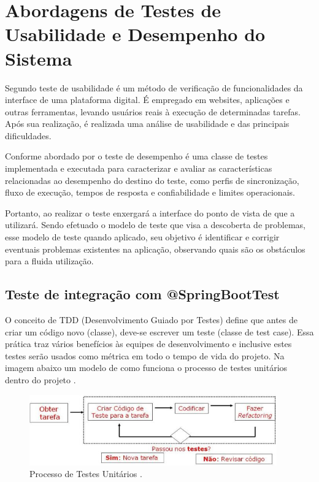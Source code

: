     
\section{Abordagens de Testes de Usabilidade e Desempenho do Sistema}

    Segundo  teste de usabilidade é um método de verificação de funcionalidades da interface de uma plataforma digital. É empregado em websites, aplicações e outras ferramentas, levando usuários reais à execução de determinadas tarefas. Após sua realização, é realizada uma análise de usabilidade e das principais dificuldades.
    
    Conforme abordado por  o teste de desempenho é uma classe de testes implementada e executada para caracterizar e avaliar as características relacionadas ao desempenho do destino do teste, como perfis de sincronização, fluxo de execução, tempos de resposta e confiabilidade e limites operacionais. 
    
    Portanto, ao realizar o teste enxergará a interface do ponto de vista de que a utilizará. Sendo efetuado o modelo de teste que visa a descoberta de problemas, esse modelo de teste quando aplicado, seu objetivo é identificar e corrigir eventuais problemas existentes na aplicação, observando quais são os obstáculos para a fluida utilização.

\subsection{Teste de integração com @SpringBootTest}

    O conceito de TDD (Desenvolvimento Guiado por Testes) define que antes de criar um código novo (classe), deve-se escrever um teste (classe de test case). Essa prática traz vários benefícios às equipes de desenvolvimento e inclusive estes testes serão usados como métrica em todo o tempo de vida do projeto. Na imagem abaixo um modelo de como funciona o processo de testes unitários dentro do projeto \cite{tdd}.
    
    \begin{figure}[h]
    \centering
    \includegraphics[width=0.95\textwidth]{./img/TDD.jpg}
    \caption{Processo de Testes Unitários .}
    \label{fig:TDD}
    \end{figure}
    
